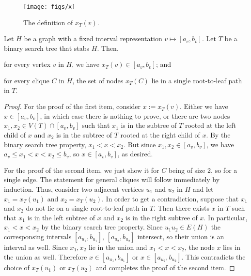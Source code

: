 \documentclass[kpfonts]{patmorin}
\let\le\leqslant
\begin{document}
\begin{figure}
  \begin{center}
    \texttt{[image: figs/x]}
  \end{center}
  \caption{The definition of $x_T(v)$.}
\end{figure}


\begin{lem}
Let $H$ be a graph with a fixed interval representation $v\mapsto[a_v,b_v]$. 
Let $T$ be a binary search tree that stabs $H$. 
Then,
\begin{compactenum}
  \item for every vertex $v$ in $H$, we have $x_{T}(v) \in [a_v,b_v]$; and
  \label{itm:v-in-its-interval}
  \item for every clique $C$ in $H$, the set of nodes $x_T(C)$ lie in a single root-to-leaf path in $T$.
  \label{itm:clique-on-a-single-path}
\end{compactenum}
\end{lem}
\begin{proof}
  For the proof of the first item, consider $x:=x_T(v)$.
  Either we have $x\in [a_v,b_v]$, in which case there is nothing to prove, 
  or there are two nodes $x_1,x_2\in V(T)\cap[a_v,b_v]$ such that $x_1$ is in the subtree of $T$ rooted at the left child of $x$ and $x_2$ is in the subtree of $T$ rooted at the right child of $x$.  
  By the binary search tree property, $x_1<x<x_2$. 
  But since $x_1,x_2 \in [a_v,b_v]$, we have $a_v\le x_1<x<x_2\le b_v$, so $x\in [a_v,b_v]$, as desired.

  For the proof of the second item, we just show it for $C$ being of size $2$, so for a single edge. 
  The statement for general cliques will follow immediately by induction.
  Thus, consider two adjacent vertices $u_1$ and $u_2$ in $H$ and 
  let $x_1=x_T(u_1)$ and $x_2=x_T(u_2)$.
  In order to get a contradiction, suppose that $x_1$ and $x_2$ do not lie on a single root-to-leaf path in $T$. 
  Then there exists $x$ in $T$ such that $x_1$ is in the left subtree of $x$ and $x_2$ is in the right subtree of $x$.
  In particular, $x_1 < x < x_2$ by the binary search tree property.
  Since $u_1u_2 \in E(H)$ the corresponsing intervals $[a_{u_1},b_{u_1}]$, $[a_{u_2}, b_{u_2}]$ intersect, so their union is an interval as well. 
  Since $x_1,x_2$ lie in the union and $x_1 < x < x_2$, the node $x$ lies in the union as well.
  Therefore $x\in[a_{u_1},b_{u_1}]$ or $x\in [a_{u_2}, b_{u_2}]$. 
  This contradicts the choice of $x_T(u_1)$ or $x_T(u_2)$ and completes the proof of the second item.
\end{proof}
\end{document}
